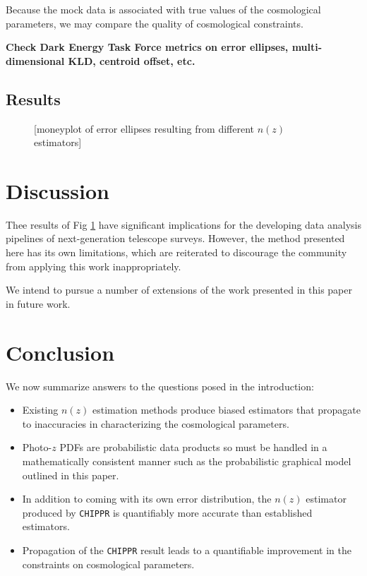 \documentclass[iop]{emulateapj}
\newcommand{\chippr}{\texttt{CHIPPR} }
\begin{document}
Because the mock data is associated with true values of the cosmological parameters, we may compare the quality of cosmological constraints.

\textbf{Check Dark Energy Task Force metrics on error ellipses, multi-dimensional KLD, centroid offset, etc.}

\subsection{Results}
\label{sec:results}

\begin{figure}
	\begin{center}
		\caption{[moneyplot of error ellipses resulting from different $n(z)$ estimators]}
		\label{fig:money}
	\end{center}
\end{figure}

\section{Discussion}
\label{sec:discussion}

Thee results of Fig \ref{fig:money} have significant implications for the developing data analysis pipelines of next-generation telescope surveys.  However, the method presented here has its own limitations, which are reiterated to discourage the community from applying this work inappropriately.

We intend to pursue a number of extensions of the work presented in this paper in future work.

\section{Conclusion}
\label{sec:conclusion}

We now summarize answers to the questions posed in the introduction:

\begin{itemize}
	\item Existing $n(z)$ estimation methods produce biased estimators that propagate to inaccuracies in characterizing the cosmological parameters.
	\item Photo-$z$ PDFs are probabilistic data products so must be handled in a mathematically consistent manner such as the probabilistic graphical model outlined in this paper.
	\item In addition to coming with its own error distribution, the $n(z)$ estimator produced by \chippr is quantifiably more accurate than established estimators.
	\item Propagation of the \chippr result leads to a quantifiable improvement in the constraints on cosmological parameters.
\end{itemize}
\end{document}
